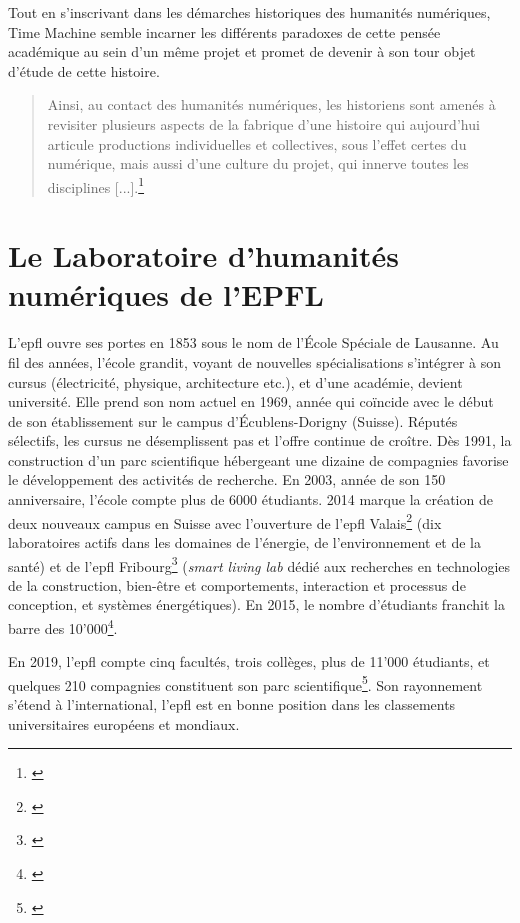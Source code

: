 Tout en s'inscrivant dans les démarches historiques des humanités numériques, Time Machine semble incarner les différents paradoxes de cette pensée académique au sein d'un même projet et promet de devenir à son tour objet d'étude de cette histoire.

\begin{quotation}Ainsi, au contact des humanités numériques, les historiens sont amenés à revisiter plusieurs aspects de la fabrique d’une histoire qui aujourd’hui articule productions individuelles et collectives, sous l’effet certes du numérique, mais aussi d’une culture du projet, qui innerve toutes les disciplines [...].\footnote{\cite[p. 42-43]{clavert_les_2019}}\end{quotation}

\section{Le Laboratoire d'humanités numériques de l'EPFL}
L'\gls{epfl} ouvre ses portes en 1853 sous le nom de l'École Spéciale de Lausanne. Au fil des années, l'école grandit, voyant de nouvelles spécialisations s'intégrer à son cursus (électricité, physique, architecture etc.), et d'une académie, devient université. Elle prend son nom actuel en 1969, année qui coïncide avec le début de son établissement sur le campus d'Écublens-Dorigny (Suisse). Réputés sélectifs, les cursus ne désemplissent pas et l'offre continue de croître. Dès 1991, la construction d'un parc scientifique hébergeant une dizaine de compagnies favorise le développement des activités de recherche. En 2003, année de son 150 anniversaire, l'école compte plus de 6000 étudiants. 2014 marque la création de deux nouveaux campus en Suisse avec l'ouverture de l'\gls{epfl} Valais\footnote{\cite{epfl_epfl_nodate-1}} (dix laboratoires actifs dans les domaines de l'énergie, de l'environnement et de la santé) et de l'\gls{epfl} Fribourg\footnote{\cite{epfl_epfl_nodate}} (\textit{\og smart living lab \fg{}}  dédié aux recherches en technologies de la construction, bien-être et comportements, interaction et processus de conception, et systèmes énergétiques). En 2015, le nombre d'étudiants franchit la barre des 10'000\footnote{\cite {epfl_history_nodate}}.

En 2019, l'\gls{epfl} compte cinq facultés, trois collèges, plus de 11'000 étudiants, et quelques 210 compagnies constituent son parc scientifique\footnote{\cite {epfl_innovation_nodate}}. Son rayonnement s'étend à l'international, l'\gls{epfl} est en bonne position dans les classements universitaires européens et mondiaux.

